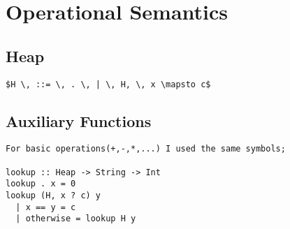 \documentclass[11pt, a4paper]{article}
\begin{document}
\section{Operational Semantics}
\subsection*{Heap}
\begin{lstlisting}
$H \, ::= \, . \, | \, H, \, x \mapsto c$
\end{lstlisting}
\subsection*{Auxiliary Functions}
\begin{lstlisting}
For basic operations(+,-,*,...) I used the same symbols;

lookup :: Heap -> String -> Int
lookup . x = 0
lookup (H, x ? c) y
  | x == y = c
  | otherwise = lookup H y
\end{lstlisting}
\end{document}
